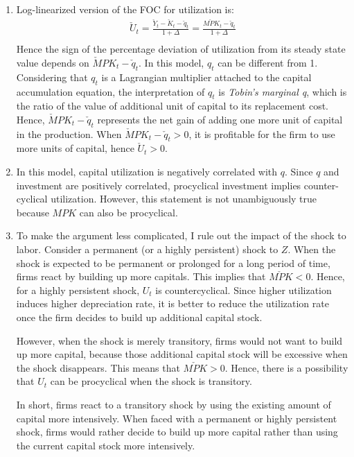 \documentclass[11pt]{amsart}
\begin{document}
\begin{enumerate}[label = (\alph*)]
	\item Log-linearized version of the FOC for utilization is:
	\begin{align*}
	\check U_t = \frac{\check Y_t  - \check K_t - \check q_t}{1 + \Delta} = \frac{\check{MPK}_t - \check q_t}{1 + \Delta} \\
	\end{align*}
	Hence the sign of the percentage deviation of utilization from its steady state value depends on $\check MPK_t - \check q_t$. In this model, $q_t$ can be different from 1. Considering that $q_t$ is a Lagrangian multiplier attached to the capital accumulation equation, the interpretation of $q_t$ is \textit{Tobin's marginal q}, which is the ratio of the value of additional unit of capital to its replacement cost. Hence, $\check MPK_t - \check q_t$ represents the net gain of adding one more unit of capital in the production. When $\check MPK_t - \check q_t > 0$, it is profitable for the firm to use more units of capital, hence $\check U_t >0$. 
	
	\item In this model, capital utilization is negatively correlated with $q$. Since $q$ and investment are positively correlated, procyclical investment implies counter-cyclical utilization. However, this statement is not unambiguously true because $MPK$ can also be procyclical. 
	
	\item To make the argument less complicated, I rule out the impact of the shock to labor. Consider a permanent (or a highly persistent) shock to $Z$. When the shock is expected to be permanent or prolonged for a long period of time, firms react by building up more capitals. This implies that $\check{MPK} <0$. Hence, for a highly persistent shock, $U_t$ is countercyclical. Since higher utilization induces higher depreciation rate, it is better to reduce the utilization rate once the firm decides to build up additional capital stock. 
	
	However, when the shock is merely transitory, firms would not want to build up more capital, because those additional capital stock will be excessive when the shock disappears. This means that $\check{MPK} >0$. Hence, there is a possibility that $U_t$ can be procyclical when the shock is transitory. 
	
	In short, firms react to a transitory shock by using the existing amount of capital more intensively. When faced with a permanent or highly persistent shock, firms would rather decide to build up more capital rather than using the current capital stock more intensively. 
\end{enumerate}
\end{document}
